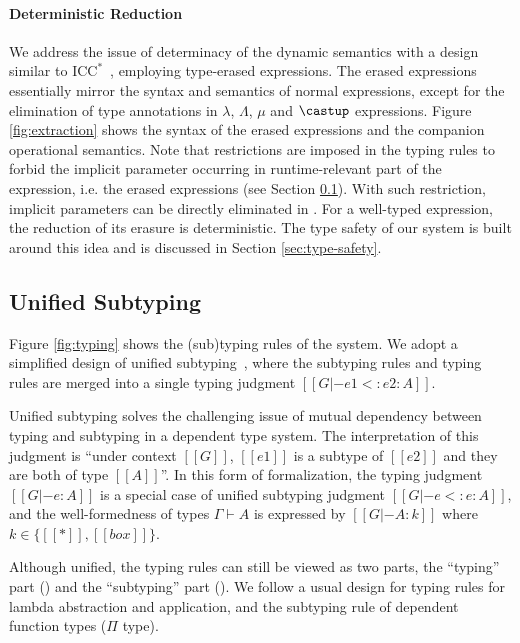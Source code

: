 \paragraph{Deterministic Reduction}
We address the issue of determinacy of the dynamic semantics with
a design similar to $\mathrm{ICC}^*$~\cite{barras2008implicit},
employing type-erased expressions. The erased expressions
essentially mirror the syntax and semantics
of normal expressions, except for the elimination of type annotations in $\lambda$,
$\Lambda$, $\mu$ and $\castup$ expressions.
Figure \ref{fig:extraction} shows the syntax of the erased expressions and
the companion operational semantics. Note that restrictions are imposed in the
typing rules to forbid the implicit parameter occurring in runtime-relevant part
of the expression, i.e. the erased expressions (see Section \ref{sec:type-system}).
With such restriction, implicit parameters can be directly eliminated in
. For a well-typed expression, the reduction of
its erasure is deterministic. The type safety of our system is built around
this idea and is discussed in Section \ref{sec:type-safety}.



\subsection{Unified Subtyping}
\label{sec:type-system}

Figure \ref{fig:typing} shows the (sub)typing rules of the system. We adopt a
simplified design of unified subtyping~\cite{yang2017unifying}, where the subtyping rules and
typing rules are merged into a single typing judgment $[[G |- e1 <: e2 : A]]$.

Unified subtyping solves the challenging issue of mutual dependency between typing
and subtyping in a dependent type system.
The interpretation of this judgment is ``under context $[[G]]$, $[[e1]]$ is a
subtype of $[[e2]]$ and they are both of type $[[A]]$''.
In this form of formalization, the typing judgment $[[G |- e : A]]$ is a
special case of unified subtyping judgment $[[G |- e <: e : A]]$,
and the well-formedness of types $\Gamma \vdash A$ is expressed by
$[[G |- A : k]]$ where $k \in \{[[*]], [[box]]\}$.

Although unified, the typing rules can still be viewed as two parts, the ``typing'' part
() and the ``subtyping'' part
(). We follow a usual design for
typing rules for lambda abstraction and application, and the subtyping rule of
dependent function types ($\Pi$ type).

